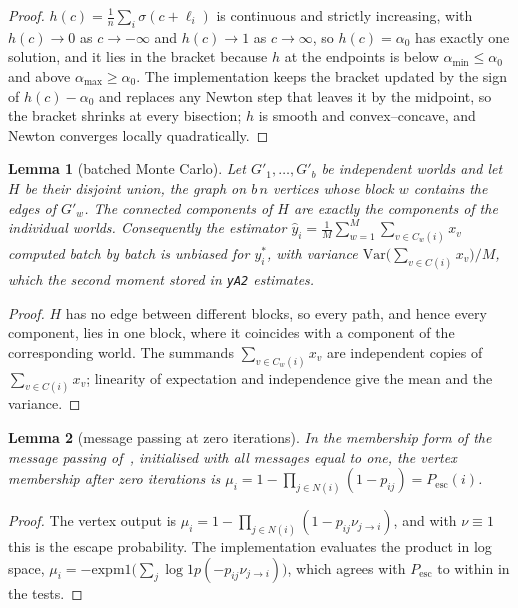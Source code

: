 \documentclass[11pt,a4paper]{article}
\newtheorem{lemma}{Lemma}
\theoremstyle{definition}
\theoremstyle{plain}
\newcommand{\Pesc}{P_{\mathrm{esc}}}
\begin{document}
\begin{proof}
$h(c)=\frac1n\sum_i\sigma(c+\ell_i)$ is continuous and strictly increasing, with $h(c)\to0$ as $c\to-\infty$ and $h(c)\to1$ as $c\to\infty$, so $h(c)=\alpha_0$ has exactly one solution, and it lies in the bracket because $h$ at the endpoints is below $\alpha_{\min}\le\alpha_0$ and above $\alpha_{\max}\ge\alpha_0$. The implementation keeps the bracket updated by the sign of $h(c)-\alpha_0$ and replaces any Newton step that leaves it by the midpoint, so the bracket shrinks at every bisection; $h$ is smooth and convex--concave, and Newton converges locally quadratically.
\end{proof}

\begin{lemma}[batched Monte Carlo]\label{lem:mc}
Let $G'_1,\dots,G'_b$ be independent worlds and let $H$ be their disjoint union, the graph on $b\,n$ vertices whose block $w$ contains the edges of $G'_w$. The connected components of $H$ are exactly the components of the individual worlds. Consequently the estimator $\hat y_i=\frac1M\sum_{w=1}^M\sum_{v\in C_w(i)}x_v$ computed batch by batch is unbiased for $y^*_i$, with variance $\mathrm{Var}\big(\sum_{v\in C(i)}x_v\big)/M$, which the second moment stored in \texttt{yA2} estimates.
\end{lemma}

\begin{proof}
$H$ has no edge between different blocks, so every path, and hence every component, lies in one block, where it coincides with a component of the corresponding world. The summands $\sum_{v\in C_w(i)}x_v$ are independent copies of $\sum_{v\in C(i)}x_v$; linearity of expectation and independence give the mean and the variance.
\end{proof}

\begin{lemma}[message passing at zero iterations]\label{lem:knz}
In the membership form of the message passing of~\cite{knz14}, initialised with all messages equal to one, the vertex membership after zero iterations is $\mu_i=1-\prod_{j\in N(i)}(1-p_{ij})=\Pesc(i)$.
\end{lemma}

\begin{proof}
The vertex output is $\mu_i=1-\prod_{j\in N(i)}(1-p_{ij}\nu_{j\to i})$, and with $\nu\equiv1$ this is the escape probability. The implementation evaluates the product in log space, $\mu_i=-\mathrm{expm1}\big(\sum_j\log1p(-p_{ij}\nu_{j\to i})\big)$, which agrees with $\Pesc$ to within \KNZzeroDiff{} in the tests.
\end{proof}
\end{document}
